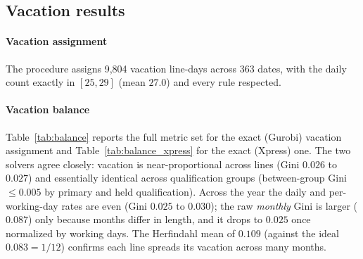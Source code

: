 \documentclass[preprint,12pt]{elsarticle}
\begin{document}
   \subsection{Vacation results}\label{subsec:vacation_results}
      \paragraph{Vacation assignment} The procedure assigns 9,804 vacation line-days across 363 dates, with the daily count exactly in $[25,29]$ (mean $27.0$) and every rule respected.

      \paragraph{Vacation balance} Table~\ref{tab:balance} reports the full metric set for the exact (Gurobi) vacation assignment and Table~\ref{tab:balance_xpress} for the exact (Xpress) one. The two solvers agree closely: vacation is near-proportional across lines (Gini $0.026$ to $0.027$) and essentially identical across qualification groups (between-group Gini $\le 0.005$ by primary and held qualification). Across the year the daily and per-working-day rates are even (Gini $0.025$ to $0.030$); the raw \emph{monthly} Gini is larger ($0.087$) only because months differ in length, and it drops to $0.025$ once normalized by working days. The Herfindahl mean of $0.109$ (against the ideal $0.083=1/12$) confirms each line spreads its vacation across many months.
\end{document}
